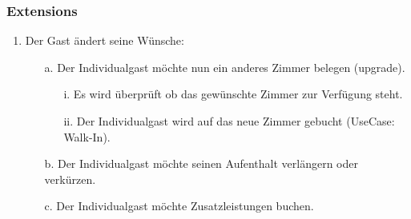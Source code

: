 \documentclass[./detailed_overview_usecases.tex]{subfiles}
\begin{document}
    \subsubsection*{Extensions}
    \begin{enumerate}
        \item Der Gast ändert seine Wünsche:
        \begin{itemize}
            \item[a.] Der Individualgast möchte nun ein anderes Zimmer belegen (upgrade).
            \begin{itemize}
                \item[i.] Es wird überprüft ob das gewünschte Zimmer zur Verfügung steht.
                \item[ii.] Der Individualgast wird auf das neue Zimmer gebucht (UseCase: Walk-In).
            \end{itemize}
            \item[b.] Der Individualgast möchte seinen Aufenthalt verlängern oder verkürzen.
            \item[c.] Der Individualgast möchte Zusatzleistungen buchen.
        \end{itemize}
    \end{enumerate}
\end{document}
